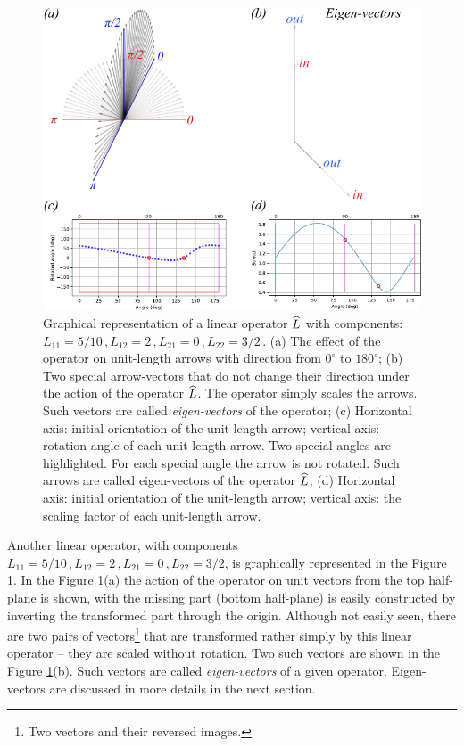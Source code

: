 \begin{figure}[htbp]
  \centering
  \includegraphics[scale=1.0]{linearOperatorActionZ}
  \caption{Graphical representation of a linear operator $\widehat{L}$ with components:
    $L_{11}=5/10\,, L_{12}=2\,, L_{21}=0\,,L_{22}=3/2\,.$ (a) The
    effect of the operator on unit-length arrows with direction from
    $0^\circ$ to $180^\circ$; (b) Two special arrow-vectors that do
    not change their direction under the action of the operator
    $\widehat{L}$. The operator simply scales the arrows. Such vectors
    are called \emph{eigen-vectors} of the operator;
    (c) Horizontal axis: initial orientation of the unit-length arrow;
    vertical axis: rotation angle of each unit-length arrow. Two
    special angles are highlighted. For each special angle the arrow is not
    rotated. Such arrows are called eigen-vectors of the operator $\widehat{L}$;
    (d) Horizontal axis: initial orientation of the unit-length arrow;
    vertical axis: the scaling factor of each unit-length arrow.}
  \label{fig:linearOperatorActionZ}
\end{figure}

Another linear operator, with components
$L_{11}=5/10\,,L_{12}=2\,,L_{21}=0\,,L_{22}=3/2$, is graphically
represented in the Figure \ref{fig:linearOperatorActionZ}. In the
Figure \ref{fig:linearOperatorActionZ}(a) the action of the operator
on unit vectors from the top half-plane is shown, with the missing part
(bottom half-plane) is easily constructed by inverting the transformed
part through the origin. Although not easily seen, there are two
pairs of vectors\footnote{Two vectors and their reversed images.} that
are transformed rather simply by this linear
operator -- they are scaled without rotation. Two such vectors
are shown in the Figure \ref{fig:linearOperatorActionZ}(b). Such vectors are
called \emph{eigen-vectors} of a given
operator. Eigen-vectors are
discussed in more details in the next section.

